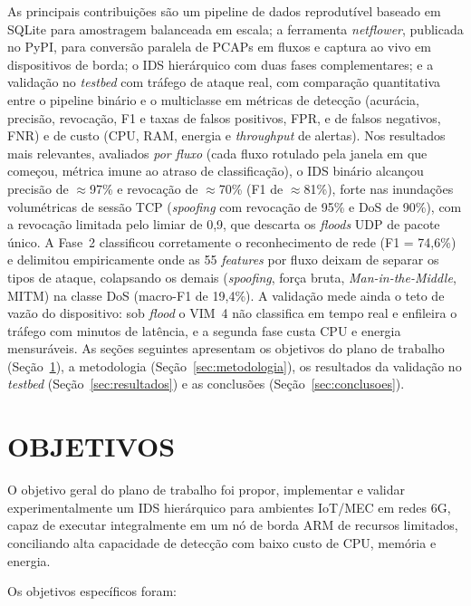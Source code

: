 \documentclass[12pt,a4paper]{article}
\begin{document}
As principais contribuições são um pipeline de dados reprodutível baseado em
SQLite para amostragem balanceada em escala; a ferramenta \textit{netflower},
publicada no PyPI, para conversão paralela de PCAPs em fluxos e captura ao
vivo em dispositivos de borda; o IDS hierárquico com duas fases
complementares; e a validação no \textit{testbed} com tráfego de ataque real,
com comparação quantitativa entre o pipeline binário e o multiclasse em
métricas de detecção (acurácia, precisão, revocação, F1 e taxas de falsos
positivos, FPR, e de falsos negativos, FNR) e de custo (CPU, RAM, energia e
\textit{throughput} de alertas). Nos resultados mais relevantes, avaliados
\emph{por fluxo} (cada fluxo rotulado pela janela em que começou, métrica imune
ao atraso de classificação), o IDS binário alcançou precisão de $\approx$97\% e
revocação de $\approx$70\% (F1 de $\approx$81\%), forte nas inundações
volumétricas de sessão TCP (\textit{spoofing} com revocação de 95\% e DoS de
90\%), com a revocação limitada pelo limiar de 0,9, que descarta os \textit{floods}
UDP de pacote único. A Fase~2 classificou corretamente o reconhecimento de rede
(F1 = 74,6\%) e delimitou empiricamente onde as 55 \textit{features} por fluxo
deixam de separar os tipos de ataque, colapsando os demais (\textit{spoofing},
força bruta, \textit{Man-in-the-Middle}, MITM) na classe DoS (macro-F1 de 19,4\%).
A validação mede ainda o teto de vazão do dispositivo: sob \textit{flood} o VIM~4
não classifica em tempo real e enfileira o tráfego com minutos de latência, e a
segunda fase custa CPU e energia mensuráveis.
As seções seguintes apresentam os objetivos do plano de trabalho
(Seção~\ref{sec:objetivos}), a metodologia (Seção~\ref{sec:metodologia}), os
resultados da validação no \textit{testbed} (Seção~\ref{sec:resultados}) e as
conclusões (Seção~\ref{sec:conclusoes}).

\section{OBJETIVOS}
\label{sec:objetivos}

O objetivo geral do plano de trabalho foi propor, implementar e validar
experimentalmente um IDS hierárquico para ambientes IoT/MEC em redes 6G,
capaz de executar integralmente em um nó de borda ARM de recursos limitados,
conciliando alta capacidade de detecção com baixo custo de CPU, memória e
energia.

Os objetivos específicos foram:
\end{document}
